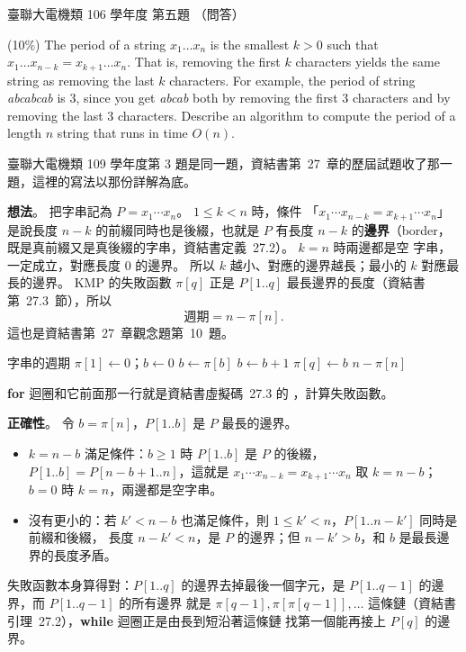 \begin{pastexam}[label={px:ust-106-ee-ds-05}]{臺聯大電機類 106 學年度 第五題}
（問答）

(10\%) The period of a string $x_1 \ldots x_n$ is the smallest $k > 0$ such that
$x_1 \ldots x_{n-k} = x_{k+1} \ldots x_n$. That is, removing the first $k$ characters yields the same
string as removing the last $k$ characters. For example, the period of string \textit{abcabcab} is 3, since you
get \textit{abcab} both by removing the first 3 characters and by removing the last 3 characters. Describe an
algorithm to compute the period of a length $n$ string that runs in time $O(n)$.
\end{pastexam}

\begin{pastsoln}
臺聯大電機類 109 學年度第 3 題是同一題，資結書第~27~章的歷屆試題收了那一題，這裡的寫法以那份詳解為底。

\textbf{想法}。 把字串記為 $P = x_1 \cdots x_n$。 $1 \le k < n$ 時，條件
「$x_1 \cdots x_{n-k} = x_{k+1} \cdots x_n$」是說長度 $n - k$ 的前綴同時也是後綴，也就是 $P$ 有長度
$n - k$ 的\textbf{邊界}（border，既是真前綴又是真後綴的字串，資結書定義~27.2）。 $k = n$ 時兩邊都是空
字串，一定成立，對應長度 $0$ 的邊界。 所以 $k$ 越小、對應的邊界越長；最小的 $k$ 對應最長的邊界。
KMP 的失敗函數 $\pi[q]$ 正是 $P[1..q]$ 最長邊界的長度（資結書第~27.3~節），所以
\[
\text{週期} = n - \pi[n].
\]
這也是資結書第~27~章觀念題第~10~題。

\begin{pseudo}{字串的週期}
    \State $\pi[1] \gets 0$；$b \gets 0$ 
            \State $b \gets \pi[b]$
        \EndWhile
            \State $b \gets b + 1$
        \EndIf
        \State $\pi[q] \gets b$
    \EndFor
    \State \Return $n - \pi[n]$
\EndFunction
\end{pseudo}
\textbf{for} 迴圈和它前面那一行就是資結書虛擬碼~27.3 的 ，計算失敗函數。

\textbf{正確性}。 令 $b = \pi[n]$，$P[1..b]$ 是 $P$ 最長的邊界。
\begin{itemize}
\item $k = n - b$ 滿足條件：$b \ge 1$ 時 $P[1..b]$ 是 $P$ 的後綴，$P[1..b] = P[n - b + 1..n]$，這就是
$x_1 \cdots x_{n-k} = x_{k+1} \cdots x_n$ 取 $k = n - b$；$b = 0$ 時 $k = n$，兩邊都是空字串。
\item 沒有更小的：若 $k' < n - b$ 也滿足條件，則 $1 \le k' < n$，$P[1..n - k']$ 同時是前綴和後綴，
長度 $n - k' < n$，是 $P$ 的邊界；但 $n - k' > b$，和 $b$ 是最長邊界的長度矛盾。
\end{itemize}
失敗函數本身算得對：$P[1..q]$ 的邊界去掉最後一個字元，是 $P[1..q-1]$ 的邊界，而 $P[1..q-1]$ 的所有邊界
就是 $\pi[q-1], \pi[\pi[q-1]], \ldots$ 這條鏈（資結書引理~27.2），\textbf{while} 迴圈正是由長到短沿著這條鏈
找第一個能再接上 $P[q]$ 的邊界。


\end{pastsoln}
